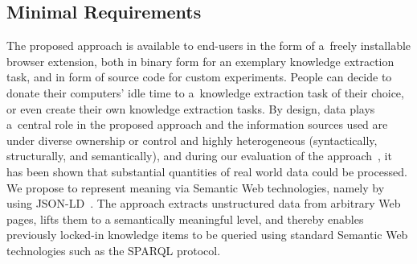 \documentclass[runningheads,a4paper]{llncs}
\begin{document}
\subsection*{Minimal Requirements}
The proposed approach is available to end-users
in the form of a~freely installable browser extension,
both in binary form for an exemplary knowledge extraction task,
and in form of source code for custom experiments.
People can decide to donate their computers' idle time
to a~knowledge extraction task of their choice,
or even create their own knowledge extraction tasks.
By design, data plays a~central role in the proposed approach
and the information sources used are under diverse ownership or control and highly heterogeneous (syntactically, structurally, and semantically), and during our evaluation of the approach~\cite{Steiner2012SEKIatHome}, it has been shown that substantial quantities of real world data could be processed.
We propose to represent meaning via Semantic Web technologies, namely by using JSON-LD~\cite{sporny2012}.
The approach extracts unstructured data from arbitrary Web pages,
lifts them to a semantically meaningful level,
and thereby enables previously locked-in knowledge items to be
queried using standard Semantic Web technologies such as the SPARQL protocol.
\end{document}
